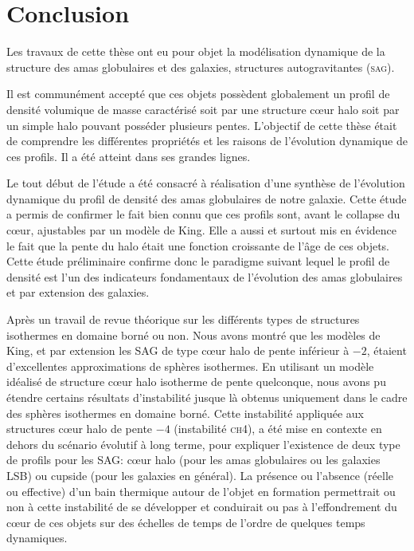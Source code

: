 \section{Conclusion}

Les travaux de cette thèse ont eu pour objet la modélisation dynamique de la structure des amas globulaires et des galaxies, structures
autogravitantes (\textsc{sag}). 



Il est communément accepté que ces objets possèdent globalement un profil de densité volumique de masse caractérisé soit par une structure cœur halo
soit par un simple halo pouvant posséder plusieurs pentes. L'objectif de cette thèse était de comprendre les différentes propriétés et les raisons de
l'évolution dynamique de ces profils. Il a été atteint dans ses grandes lignes.



Le tout début de l'étude a été consacré à réalisation d'une synthèse de l'évolution dynamique du profil de densité des amas globulaires de notre
galaxie. Cette étude a permis de confirmer le fait bien connu que ces profils sont, avant le collapse du cœur, ajustables par un modèle de King. Elle
a aussi et surtout mis en évidence le fait que la pente du halo était une fonction croissante de l'âge de ces objets. Cette étude préliminaire
confirme donc le paradigme suivant lequel le profil de densité est l'un des indicateurs fondamentaux de l'évolution des amas globulaires et par
extension des galaxies.


Après un travail de revue théorique sur les différents types de structures isothermes en domaine borné ou non. Nous avons montré que les modèles de
King, et par extension les \textsc{SAG} de type cœur halo de pente inférieur à $-2$, étaient d'excellentes approximations de sphères isothermes. En
utilisant un modèle idéalisé de structure cœur halo isotherme de pente quelconque, nous avons pu étendre certains résultats d'instabilité jusque là
obtenus uniquement dans le cadre des sphères isothermes en domaine borné. Cette instabilité appliquée aux structures cœur halo de pente $-4$
(instabilité \textsc{ch4}), a été mise en contexte  en dehors du scénario évolutif à long terme, pour expliquer l'existence de deux type de profils
pour les \textsc{SAG}: cœur halo (pour les amas globulaires ou les galaxies LSB) ou cupside (pour les galaxies en général). La présence ou l'absence
(réelle ou effective) d'un bain thermique autour de l'objet en formation permettrait ou non à cette instabilité de se développer et conduirait ou pas
à l'effondrement du cœur de ces objets sur des échelles de temps de l'ordre de quelques temps dynamiques.



